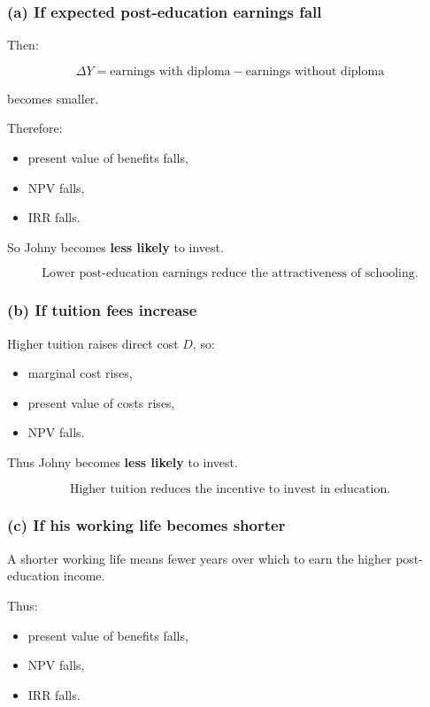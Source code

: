 \documentclass[12pt]{article}
\begin{document}
\subsubsection*{(a) If expected post-education earnings fall}

Then:

\[
\Delta Y = \text{earnings with diploma} - \text{earnings without diploma}
\]

becomes smaller.

Therefore:
\begin{itemize}
    \item present value of benefits falls,
    \item NPV falls,
    \item IRR falls.
\end{itemize}

So Johny becomes \textbf{less likely} to invest.

\[
\boxed{\text{Lower post-education earnings reduce the attractiveness of schooling.}}
\]

\subsubsection*{(b) If tuition fees increase}

Higher tuition raises direct cost \(D\), so:
\begin{itemize}
    \item marginal cost rises,
    \item present value of costs rises,
    \item NPV falls.
\end{itemize}

Thus Johny becomes \textbf{less likely} to invest.

\[
\boxed{\text{Higher tuition reduces the incentive to invest in education.}}
\]

\subsubsection*{(c) If his working life becomes shorter}

A shorter working life means fewer years over which to earn the higher post-education income.

Thus:
\begin{itemize}
    \item present value of benefits falls,
    \item NPV falls,
    \item IRR falls.
\end{itemize}
\end{document}
